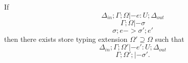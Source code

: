 \begin{theorem}
  If \[\Delta_{in} ; \Gamma ; \Omega |- e : U ; \Delta_{out}\] \[\Gamma ; \Omega |- \sigma\] \[\sigma ; e -> \sigma' ; e'\]
  then there exists store typing extension $\Omega' \supseteq \Omega$ such that \[\Delta_{in} ; \Gamma ; \Omega'
  |- e' : U ; \Delta_{out}\] \[\Gamma ; \Omega'; |- \sigma'.\]
\end{theorem}

\begin{comment}
\begin{theorem}[Local progress]
  For all affine typings $\Delta_{in}$ and $\Delta_{out}$, intuitionistic typings $\Gamma$, and
  store typings $\Omega$, if $\Delta_{in} ; \Gamma ; \Omega |- e : U ; \Delta_{out}$ and $\Gamma ; \Omega |- \sigma$,
  then either $\Lterm{e}$ or there exists $\sigma' ; e'$ such that $\sigma ; e -> \sigma' ; e'$.
\end{theorem}

\begin{theorem}[Local preservation]
  For all $\sigma ; e$, $\sigma'; e'$, affine typings $\Delta_{in}$ and $\Delta_{out}$,
  intuitionistic typings $\Gamma$, and store typings $\Omega$, if $\Delta_{in} ; \Gamma ; \Omega |- e : U
  ; \Delta_{out}$, $\Gamma ; \Omega |- \sigma$, and $\sigma ; e -> \sigma' ; e'$, then there exists store
  typing extension $\Omega' \supseteq \Omega$ such that $\Delta_{in} ; \Gamma ; \Omega' |- e' : U ; \Delta_{out}$ and $\Gamma
  ; \Omega'; |- \sigma'$.
\end{theorem}
\end{comment}

\newpage
